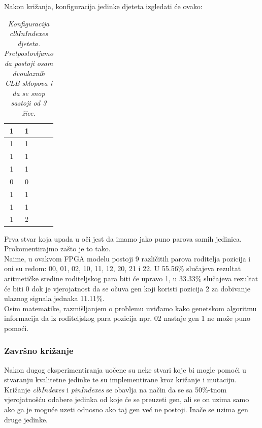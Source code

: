 \documentclass[times, utf8, zavrsni]{fer}
\begin{document}
Nakon križanja, konfiguracija jedinke djeteta izgledati će ovako:

\begin{table}[H]
	\caption{\emph{Konfiguracija \emph{clbInIndexes} djeteta. Pretpostovljamo da postoji osam dvoulaznih CLB sklopova i da se snop sastoji od 3 žice. }}
	\label{chromoClbIndexChild}
	\centering
	\begin{tabular}{|c|c|c|c|} \hline
		1 & 1 \\ \hline
		1 & 1 \\ \hline
		1 & 1 \\ \hline
		1 & 1 \\ \hline
		0 & 0 \\ \hline
		1 & 1 \\ \hline
		1 & 1 \\ \hline
		1 & 2 \\ \hline
	\end{tabular}
\end{table}

Prva stvar koja upada u oči jest da imamo jako puno parova samih jedinica. Prokomentirajmo zašto je to tako. \\
Naime, u ovakvom FPGA modelu postoji 9 različitih parova roditelja pozicija i oni su redom: 00, 01, 02, 10, 11, 12, 20, 21 i 22. U 55.56\% slučajeva rezultat aritmetičke sredine roditeljskog para biti će upravo 1, u 33.33\% slučajeva rezultat će biti 0 dok je vjerojatnost da se očuva gen koji koristi pozicija 2 za dobivanje ulaznog signala jednaka 11.11\%. \\ 
Osim matematike, razmišljanjem o problemu uviđamo kako genetskom algoritmu informacija da iz roditeljskog para pozicija npr. 02 nastaje gen 1 ne može puno pomoći. 


\subsubsection{Završno križanje}
\label{ValidCrosser}

Nakon dugog eksperimentiranja uočene su neke stvari koje bi mogle pomoći u stvaranju kvalitetne jedinke te su implementirane kroz križanje i mutaciju. Križanje \emph{clbIndexes} i \emph{pinIndexes} se obavlja na način da se sa 50\%-tnom vjerojatnošću odabere jedinka od koje će se preuzeti gen, ali se on uzima samo ako ga je moguće uzeti odnosno ako taj gen već ne postoji. Inače se uzima gen druge jedinke.
\end{document}
